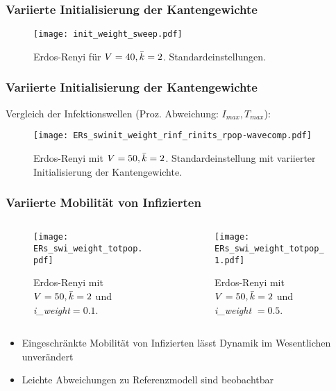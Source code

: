 \begin{frame}[t]
    \frametitle{Variierte Initialisierung der Kantengewichte}
    \begin{figure}[htpb]
        \centering
        \texttt{[image: init\_weight\_sweep.pdf]}
        \caption{Erdos-Renyi für $V = 40, \bar{k}=2$. Standardeinstellungen.}%
        \label{fig:init_weight_sweep}
    \end{figure}
\end{frame}
\begin{frame}[t]
\frametitle{Variierte Initialisierung der Kantengewichte}
Vergleich der Infektionswellen (Proz. Abweichung: $I_{max}, T_{max}$):
    \begin{figure}[htpb]
        \centering
        \texttt{[image: ERs\_swinit\_weight\_rinf\_rinits\_rpop-wavecomp.pdf]}
        \caption{Erdos-Renyi mit $V = 50, \bar{k}=2$. Standardeinstellung mit variierter
        Initialisierung der Kantengewichte.}%
        \label{fig:ERs_swinit_weight_rinf_rinits_rpop-wavecomp}
    \end{figure}
\end{frame}
\begin{frame}[t]
    \frametitle{Variierte Mobilität von Infizierten}
    \begin{columns}
        \begin{column}{0.5\textwidth}
            \begin{figure}[htpb]
                \centering
                \texttt{[image: ERs\_swi\_weight\_totpop.pdf]}
                \caption{Erdos-Renyi mit $V=50, \bar{k}=2$ und \emph{i\_weight}$=0.1$.}%
                \label{fig:ERs_swi_weight_totpop}
            \end{figure}
        \end{column}
        \begin{column}{0.5\textwidth}
            \begin{figure}[htpb]
                \centering
                \texttt{[image: ERs\_swi\_weight\_totpop\_1.pdf]}
                \caption{Erdos-Renyi mit $V=50, \bar{k}=2$ und \emph{i\_weight} $=0.5$.}%
                \label{fig:ERs_swi_weight_totpop_05}
            \end{figure}
        \end{column}
    \end{columns}
    \begin{itemize}
        \item Eingeschränkte Mobilität von Infizierten lässt Dynamik im Wesentlichen unverändert
        \item Leichte Abweichungen zu Referenzmodell sind beobachtbar
    \end{itemize}
\end{frame}

